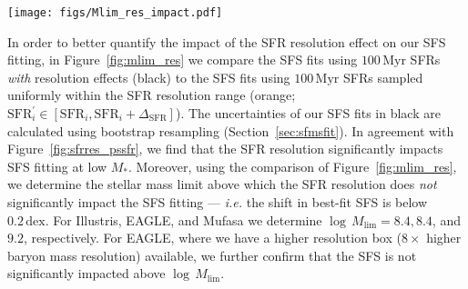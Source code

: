 \documentclass[preprint2,tighten]{aastex62}
\begin{document}
\begin{figure*}
\begin{center}
\texttt{[image: figs/Mlim\_res\_impact.pdf]} 
\caption{The resolution effect of $100\,\mathrm{Myr}$ SFRs in the 
hydrodynamic simulations (Illustris, EAGLE, and {\sc Mufasa}) impact 
SFS fitting at low stellar mass. In black we plot the best-fit SFS 
with the resolution effects. In orange we plot the best-fit SFS where 
the SFR for each galaxy is sampled uniformly within the resolution range: 
$\mathrm{SFR}_i^{\prime} \in [\mathrm{SFR}_i, \mathrm{SFR}_i +
\Delta_\mathrm{SFR}]$). SFR resolution impacts SFS fits at low 
stellar mass. Based on the discrepancy between the fits, we determine 
stellar mass limits above which the SFR resolution does {\em not} 
significantly impact ($< 0.2\,\mathrm{dex}$) the SFS fit. For Illustris, 
EAGLE, and {\sc Mufasa} this corresponds to $\log M_\mathrm{lim} = 8.4, 8.4$, 
and $9.2$, respectively.} 
\label{fig:mlim_res}
\end{center}
\end{figure*}
In order to better quantify the impact of the SFR resolution effect
on our SFS fitting, in Figure~\ref{fig:mlim_res} we compare the SFS fits 
using $100\,\mathrm{Myr}$ SFRs \emph{with} resolution effects (black) to 
the SFS fits using $100\,\mathrm{Myr}$ SFRs sampled uniformly within the 
SFR resolution range (orange; 
$\mathrm{SFR}_i^{\prime} \in [\mathrm{SFR}_i, \mathrm{SFR}_i + \Delta_\mathrm{SFR}]$). 
The uncertainties of our SFS fits in black are calculated using bootstrap 
resampling (Section~\ref{sec:sfmsfit}). In agreement with 
Figure~\ref{fig:sfrres_pssfr}, we find that the SFR resolution 
significantly impacts SFS fitting at low $M_*$. Moreover, using the 
comparison of Figure~\ref{fig:mlim_res}, we determine the stellar mass 
limit above which the SFR resolution does {\em not} significantly impact 
the SFS fitting --- \emph{i.e.} the shift in best-fit SFS is below 
$0.2\,\mathrm{dex}$. For Illustris, EAGLE, and {\sc Mufasa} we determine 
$\log\,M_\mathrm{lim} = 8.4, 8.4$, and  $9.2$, respectively. {\color{red} 
For EAGLE, where we have a higher resolution box ($8\times$ higher baryon 
mass resolution) available, we further confirm that the SFS is not significantly impacted above $\log\,M_\mathrm{lim}$.}
\end{document}
